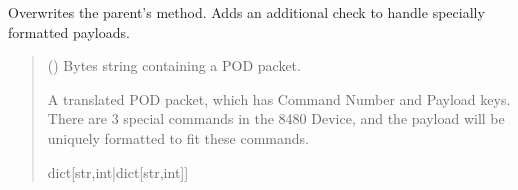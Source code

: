 \documentclass[letterpaper,10pt,english]{sphinxmanual}
\begin{document}
\begin{fulllineitems}
\begin{fulllineitems}
\end{fulllineitems}


\begin{fulllineitems}
\label{\detokenize{PodDevice_8480SC:PodDevice_8480SC.POD_8480SC.TranslatePODpacket}}
\pysigstartsignatures
{}
\pysigstopsignatures
\sphinxAtStartPar
Overwrites the parent’s method. Adds an additional check to handle specially formatted         payloads.
\begin{quote}\begin{description}
\sphinxAtStartPar
{} () \textendash{} Bytes string containing a POD packet.

\sphinxAtStartPar
A translated POD packet, which has Command Number and Payload                 keys. There are 3 special commands in the 8480 Device, and the payload will be uniquely formatted                 to fit these commands.

\sphinxAtStartPar
dict{[}str,int|dict{[}str,int{]}{]}

\end{description}\end{quote}

\end{fulllineitems}



\end{fulllineitems}
\end{document}
